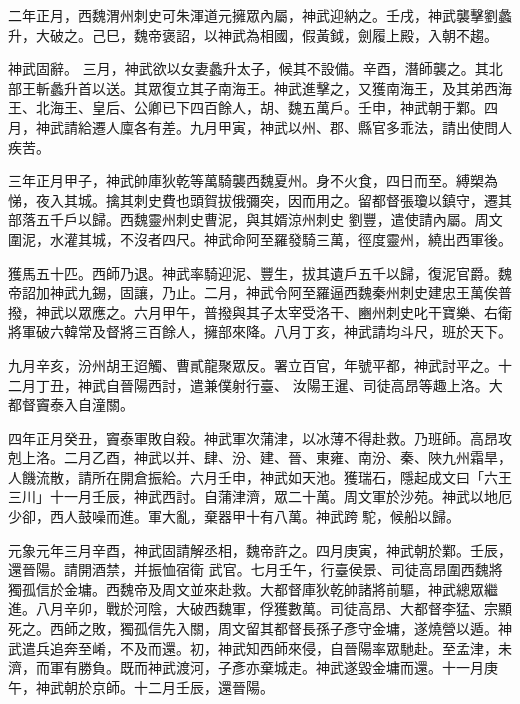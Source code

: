 \begin{pinyinscope}
 二年正月，西魏渭州刺史可朱渾道元擁眾內屬，神武迎納之。壬戌，神武襲擊劉蠡升，大破之。己巳，魏帝褒詔，以神武為相國，假黃鉞，劍履上殿，入朝不趨。



 神武固辭。
 三月，神武欲以女妻蠡升太子，候其不設備。辛酉，潛師襲之。其北部王斬蠡升首以送。其眾復立其子南海王。神武進擊之，又獲南海王，及其弟西海王、北海王、皇后、公卿已下四百餘人，胡、魏五萬戶。壬申，神武朝于鄴。四月，神武請給遷人廩各有差。九月甲寅，神武以州、郡、縣官多乖法，請出使問人疾苦。



 三年正月甲子，神武帥庫狄乾等萬騎襲西魏夏州。身不火食，四日而至。縛槊為悌，夜入其城。擒其刺史費也頭賀拔俄彌突，因而用之。留都督張瓊以鎮守，遷其部落五千戶以歸。西魏靈州刺史曹泥，與其婿涼州刺史
 劉豐，遣使請內屬。周文圍泥，水灌其城，不沒者四尺。神武命阿至羅發騎三萬，徑度靈州，繞出西軍後。



 獲馬五十匹。西師乃退。神武率騎迎泥、豐生，拔其遺戶五千以歸，復泥官爵。魏帝詔加神武九錫，固讓，乃止。二月，神武令阿至羅逼西魏秦州刺史建忠王萬俟普撥，神武以眾應之。六月甲午，普撥與其子太宰受洛干、豳州刺史叱干寶樂、右衛將軍破六韓常及督將三百餘人，擁部來降。八月丁亥，神武請均斗尺，班於天下。



 九月辛亥，汾州胡王迢觸、曹貳龍聚眾反。署立百官，年號平都，神武討平之。十二月丁丑，神武自晉陽西討，遣兼僕射行臺、
 汝陽王暹、司徒高昂等趣上洛。大都督竇泰入自潼關。



 四年正月癸丑，竇泰軍敗自殺。神武軍次蒲津，以冰薄不得赴救。乃班師。高昂攻剋上洛。二月乙酉，神武以并、肆、汾、建、晉、東雍、南汾、秦、陜九州霜旱，人饑流散，請所在開倉振給。六月壬申，神武如天池。獲瑞石，隱起成文曰「六王三川」十一月壬辰，神武西討。自蒲津濟，眾二十萬。周文軍於沙苑。神武以地厄少卻，西人鼓噪而進。軍大亂，棄器甲十有八萬。神武跨駝，候船以歸。



 元象元年三月辛酉，神武固請解丞相，魏帝許之。四月庚寅，神武朝於鄴。壬辰，還晉陽。請開酒禁，并振恤宿衛
 武官。七月壬午，行臺侯景、司徒高昂圍西魏將獨孤信於金墉。西魏帝及周文並來赴救。大都督庫狄乾帥諸將前驅，神武總眾繼進。八月辛卯，戰於河陰，大破西魏軍，俘獲數萬。司徒高昂、大都督李猛、宗顯死之。西師之敗，獨孤信先入關，周文留其都督長孫子彥守金墉，遂燒營以遁。神武遣兵追奔至崤，不及而還。初，神武知西師來侵，自晉陽率眾馳赴。至孟津，未濟，而軍有勝負。既而神武渡河，子彥亦棄城走。神武遂毀金墉而還。十一月庚午，神武朝於京師。十二月壬辰，還晉陽。




\end{pinyinscope}
